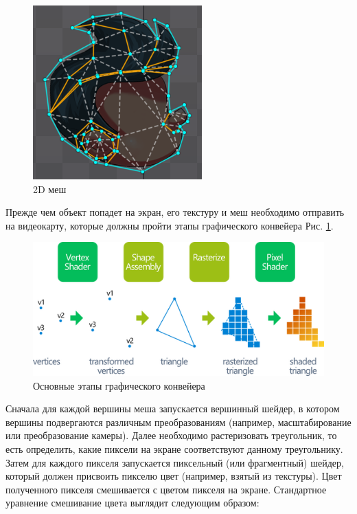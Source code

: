 \documentclass{fefu_thesis/cls/fefu}
\begin{document}
    \begin{figure}[H]
        \centering
        \includegraphics[scale=0.5]{images/spine_mesh.png}
        \caption{2D меш}
    \end{figure}

    Прежде чем объект попадет на экран, его текстуру и меш необходимо отправить на видеокарту, которые должны пройти этапы графического конвейера Рис. \ref{GraphicsPipeline}.

    \begin{figure}[H]
        \centering
        \includegraphics[scale=0.8]{images/graphicspipeline.png}
        \caption{Основные этапы графического конвейера}
        \label{GraphicsPipeline}
    \end{figure}

    Сначала для каждой вершины меша запускается вершинный шейдер, в котором вершины подвергаются различным преобразованиям (например, масштабирование или преобразование камеры). Далее необходимо растеризовать треугольник, то есть определить, какие пиксели на экране соответствуют данному треугольнику. Затем для каждого пикселя запускается пиксельный (или фрагментный) шейдер, который должен присвоить пикселю цвет (например, взятый из текстуры). Цвет полученного пикселя смешивается с цветом пикселя на экране. Стандартное уравнение смешивание цвета выглядит следующим образом:
\end{document}
